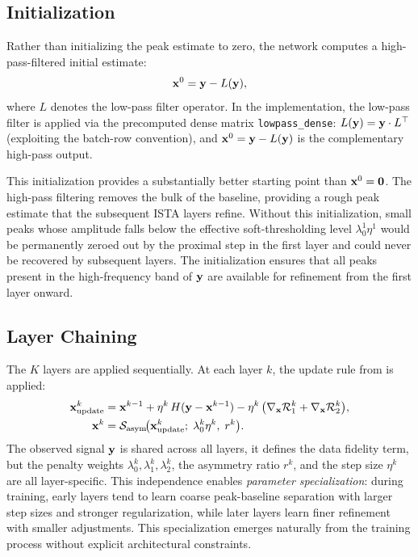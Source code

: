\subsection{Initialization}
\label{sec:method_initialization}

Rather than initializing the peak estimate to zero, the network computes a high-pass-filtered initial estimate:
\begin{equation}
    \mathbf{x}^0 = \mathbf{y} - L(\mathbf{y}),
    \label{eq:init_highpass}
\end{equation}
where $L$ denotes the low-pass filter operator. In the implementation, the low-pass filter is applied via the precomputed dense matrix \texttt{lowpass\_dense}: $L(\mathbf{y}) = \mathbf{y} \cdot L^\top$ (exploiting the batch-row convention), and $\mathbf{x}^0 = \mathbf{y} - L(\mathbf{y})$ is the complementary high-pass output.

This initialization provides a substantially better starting point than $\mathbf{x}^0 = \mathbf{0}$. The high-pass filtering removes the bulk of the baseline, providing a rough peak estimate that the subsequent ISTA layers refine. Without this initialization, small peaks whose amplitude falls below the effective soft-thresholding level $\lambda_0^1 \eta^1$ would be permanently zeroed out by the proximal step in the first layer and could never be recovered by subsequent layers. The initialization ensures that all peaks present in the high-frequency band of $\mathbf{y}$ are available for refinement from the first layer onward.


\subsection{Layer Chaining}
\label{sec:method_chaining}

The $K$ layers are applied sequentially. At each layer $k$, the update rule from  is applied:
\begin{align}
    \mathbf{x}_{\text{update}}^k &= \mathbf{x}^{k-1} + \eta^k\, H(\mathbf{y} - \mathbf{x}^{k-1}) - \eta^k\, \big(\nabla_{\mathbf{x}} \mathcal{R}_1^k + \nabla_{\mathbf{x}} \mathcal{R}_2^k\big), \\
    \mathbf{x}^k &= \mathcal{S}_{\text{asym}}\!\big(\mathbf{x}_{\text{update}}^k;\; \lambda_0^k \eta^k,\; r^k\big).
\end{align}
The observed signal $\mathbf{y}$ is shared across all layers, it defines the data fidelity term, but the penalty weights $\lambda_0^k, \lambda_1^k, \lambda_2^k$, the asymmetry ratio $r^k$, and the step size $\eta^k$ are all layer-specific. This independence enables \emph{parameter specialization}: during training, early layers tend to learn coarse peak-baseline separation with larger step sizes and stronger regularization, while later layers learn finer refinement with smaller adjustments. This specialization emerges naturally from the training process without explicit architectural constraints.

